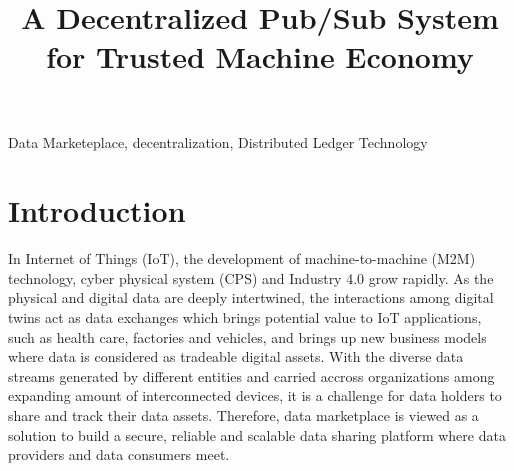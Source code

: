 \documentclass[conference]{IEEEtran}
\begin{document}
\title{A Decentralized Pub/Sub System for Trusted Machine Economy}

\author{
\and
{}
\and
{}
}

\maketitle

\begin{abstract}

\end{abstract}

\begin{IEEEkeywords}
Data Marketeplace, decentralization, Distributed Ledger Technology
\end{IEEEkeywords}

\section{Introduction}
In Internet of Things (IoT), the development of machine-to-machine (M2M) technology\cite{M2M}, cyber physical system (CPS)\cite{CPS} and Industry 4.0 grow rapidly. As the physical and digital data are deeply intertwined, the interactions among digital twins act as data exchanges\cite{digitaltwin} which brings potential value to IoT applications, such as health care\cite{healthCare}, factories and vehicles\cite{AutonomousDriving}, and brings up new business models where data is considered as tradeable digital assets. With the diverse data streams generated by different entities and carried accross organizations among expanding amount of interconnected devices, it is a challenge for data holders to share and track their data assets. Therefore, data marketplace is viewed as a solution to build a secure, reliable and scalable data sharing platform where data providers and data consumers meet.
\end{document}
